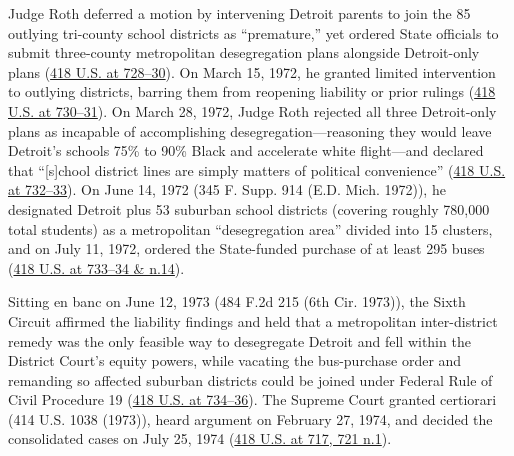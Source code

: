 \documentclass[12pt]{article}
\begin{document}
Judge Roth deferred a motion by intervening Detroit parents to join the 85 outlying tri-county school districts as ``premature,'' yet ordered State officials to submit three-county metropolitan desegregation plans alongside Detroit-only plans (\href{https://supreme.justia.com/cases/federal/us/418/717/}{418 U.S. at 728--30}). On March 15, 1972, he granted limited intervention to outlying districts, barring them from reopening liability or prior rulings (\href{https://supreme.justia.com/cases/federal/us/418/717/}{418 U.S. at 730--31}). On March 28, 1972, Judge Roth rejected all three Detroit-only plans as incapable of accomplishing desegregation---reasoning they would leave Detroit's schools 75\% to 90\% Black and accelerate white flight---and declared that ``[s]chool district lines are simply matters of political convenience'' (\href{https://supreme.justia.com/cases/federal/us/418/717/}{418 U.S. at 732--33}). On June 14, 1972 (345 F. Supp. 914 (E.D. Mich. 1972)), he designated Detroit plus 53 suburban school districts (covering roughly 780,000 total students) as a metropolitan ``desegregation area'' divided into 15 clusters, and on July 11, 1972, ordered the State-funded purchase of at least 295 buses (\href{https://supreme.justia.com/cases/federal/us/418/717/}{418 U.S. at 733--34 \& n.14}).

Sitting en banc on June 12, 1973 (484 F.2d 215 (6th Cir. 1973)), the Sixth Circuit affirmed the liability findings and held that a metropolitan inter-district remedy was the only feasible way to desegregate Detroit and fell within the District Court's equity powers, while vacating the bus-purchase order and remanding so affected suburban districts could be joined under Federal Rule of Civil Procedure 19 (\href{https://supreme.justia.com/cases/federal/us/418/717/}{418 U.S. at 734--36}). The Supreme Court granted certiorari (414 U.S. 1038 (1973)), heard argument on February 27, 1974, and decided the consolidated cases on July 25, 1974 (\href{https://supreme.justia.com/cases/federal/us/418/717/}{418 U.S. at 717, 721 n.1}).
\end{document}
